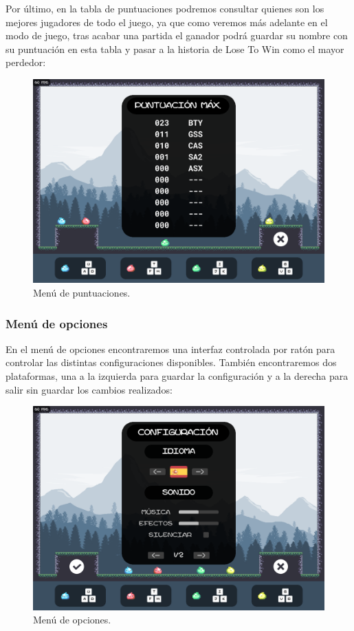 \documentclass[12pt, spanish]{article}
\begin{document}
Por último, en la tabla de puntuaciones podremos consultar quienes son los mejores jugadores de todo el juego, ya que como veremos más adelante en el modo de juego, tras acabar una partida el ganador podrá guardar su nombre con su puntuación en esta tabla y pasar a la historia de Lose To Win como el mayor perdedor:

\begin{figure}[H]
	\centering
	\includegraphics[width=\textwidth]{"tabla_puntuaciones.png"}
	\caption{Menú de puntuaciones.}\label{figure:tabla_puntuaciones}
\end{figure}

\newpage

\subsubsection{Menú de opciones}

En el menú de opciones encontraremos una interfaz controlada por ratón para controlar las distintas configuraciones disponibles. También encontraremos dos plataformas, una a la izquierda para guardar la configuración y a la derecha para salir sin guardar los cambios realizados:

\begin{figure}[H]
	\centering
	\includegraphics[width=\textwidth]{"opciones/idiomas/spanish.png"}
	\caption{Menú de opciones.}\label{figure:menu_opciones}
\end{figure}
\end{document}
